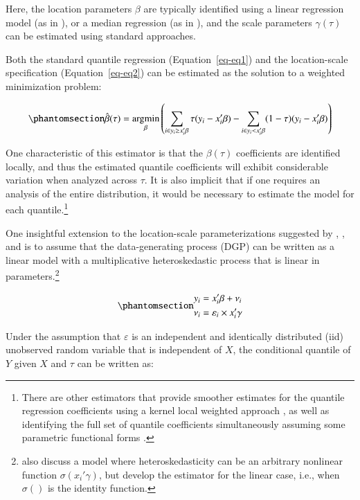 \documentclass[
  authoryear,
  review,
  1p]{elsarticle}
\begin{document}
Here, the location parameters \(\beta\) are typically identified using a
linear regression model (as in \citet{mss2019}), or a median regression
(as in \citet{zhao2000}), and the scale parameters \(\gamma(\tau)\) can
be estimated using standard approaches.

Both the standard quantile regression (Equation~\ref{eq-eq1}) and the
location-scale specification (Equation~\ref{eq-eq2}) can be estimated as
the solution to a weighted minimization problem:

\begin{equation}\phantomsection\label{eq-eq3}{\hat{\beta}(\tau) = \underset{\beta}{\operatorname{argmin}}
\left( \sum_{i\in y_i\geq x_i'\beta} \tau (y_i - x_i'\beta) - \sum_{i\in y_i<x_i'\beta} (1-\tau)(y_i - x_i'\beta) \right)
}\end{equation}

One characteristic of this estimator is that the \(\beta(\tau)\)
coefficients are identified locally, and thus the estimated quantile
coefficients will exhibit considerable variation when analyzed across
\(\tau\). It is also implicit that if one requires an analysis of the
entire distribution, it would be necessary to estimate the model for
each quantile.\footnote{There are other estimators that provide smoother
  estimates for the quantile regression coefficients using a kernel
  local weighted approach \citep{kaplan2017}, as well as identifying the
  full set of quantile coefficients simultaneously assuming some
  parametric functional forms \citep{frumentobotai2016}.}

One insightful extension to the location-scale parameterizations
suggested by \citet{he1997}, \citet{cameron2005}, and \citet{mss2019} is
to assume that the data-generating process (DGP) can be written as a
linear model with a multiplicative heteroskedastic process that is
linear in parameters.\footnote{\citet{mss2019} also discuss a model
  where heteroskedasticity can be an arbitrary nonlinear function
  \(\sigma(x_i'\gamma)\), but develop the estimator for the linear case,
  i.e., when \(\sigma()\) is the identity function.}

\begin{equation}\phantomsection\label{eq-eq4}{\begin{aligned}
y_i &=x_i'\beta+\nu_i \\
\nu_i &=\varepsilon_i \times x_i'\gamma 
\end{aligned}
}\end{equation}

Under the assumption that \(\varepsilon\) is an independent and
identically distributed (iid) unobserved random variable that is
independent of \(X\), the conditional quantile of \(Y\) given \(X\) and
\(\tau\) can be written as:
\end{document}
